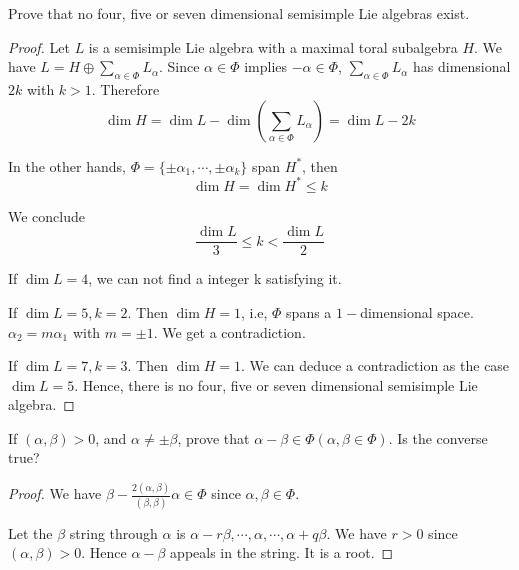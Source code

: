 \begin{ex}
  Prove that no four, five or seven dimensional semisimple Lie algebras exist.
\end{ex}
\begin{proof}
  Let $L$ is a semisimple Lie algebra with a maximal toral subalgebra $H$.
  We have $L = H \oplus\sum\limits_{\alpha\in\Phi} L_{\alpha}$.
  Since $\alpha\in\Phi$ implies $-\alpha\in\Phi$, $\sum\limits_{\alpha\in\Phi} L_{\alpha}$ has dimensional $2k$ with $k > 1$. Therefore
  \begin{equation*}
    \dim H = \dim L - \dim(\sum\limits_{\alpha\in\Phi} L_{\alpha}) = \dim L - 2k
  \end{equation*}

  In the other hands, $\Phi = \{\pm\alpha_1,\cdots, \pm\alpha_k\}$ span $H^{\ast}$, then
  \begin{equation*}
    \dim H = \dim H^{\ast} \leqslant k
  \end{equation*}

  We conclude
  \begin{equation*}
    \frac{\dim L}{3}\leqslant k < \frac{\dim L}{2}
  \end{equation*}

  If $\dim L = 4$, we can not find a integer k satisfying it.

  If $\dim L = 5, k = 2$. Then $\dim H = 1$, i.e, $\Phi$ spans a $1-$dimensional space. $\alpha_2 = m\alpha_1$ with $m = \pm1$. We get a contradiction.

  If $\dim L = 7, k = 3$. Then $\dim H = 1$. We can deduce a contradiction as the case $\dim L = 5$. Hence, there is no four, five or seven dimensional semisimple Lie algebra.
\end{proof}

\begin{ex}
  If $(\alpha,\beta) > 0$, and $\alpha\neq\pm\beta$, prove that $\alpha-\beta\in\Phi (\alpha,\beta\in\Phi)$. Is the converse true?
\end{ex}
\begin{proof}
  We have $\beta-\frac{2(\alpha,\beta)}{(\beta,\beta)}\alpha\in\Phi$ since $\alpha,\beta\in\Phi$.

  Let the $\beta$ string through $\alpha$ is $\alpha-r\beta,\cdots, \alpha,\cdots, \alpha+q\beta$. We have $r > 0$ since $(\alpha,\beta) > 0$. Hence $\alpha-\beta$ appeals in the string. It is a root.
\end{proof}
